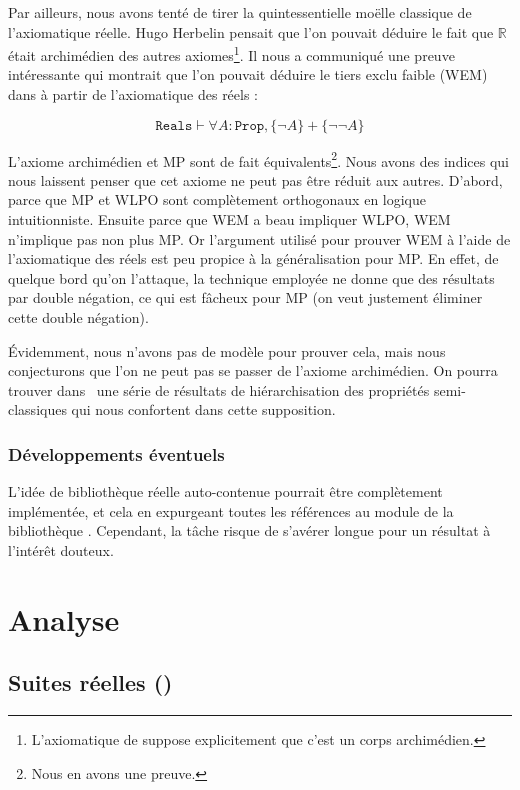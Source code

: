 Par ailleurs, nous avons tenté de tirer la quintessentielle moëlle classique de l'axiomatique réelle. Hugo Herbelin pensait que l'on pouvait déduire le fait que $\mathbb{R}$ était archimédien des autres axiomes\footnote{L'axiomatique de \coq suppose explicitement que c'est un corps archimédien.}. Il nous a communiqué une preuve intéressante qui montrait que l'on pouvait déduire le tiers exclu faible (WEM) dans  à partir de l'axiomatique des réels :

$$\mathtt{Reals}\vdash\forall A : \mathtt{Prop}, \{\neg A\} + \{\neg\neg A\}$$

L'axiome archimédien et MP sont de fait équivalents\footnote{Nous en avons une preuve.}. Nous avons des indices qui nous laissent penser que cet axiome ne peut pas être réduit aux autres. D'abord, parce que MP et WLPO sont complètement orthogonaux en logique intuitionniste. Ensuite parce que WEM a beau impliquer WLPO, WEM n'implique pas non plus MP. Or l'argument utilisé pour prouver WEM à l'aide de l'axiomatique des réels est peu propice à la généralisation pour MP. En effet, de quelque bord qu'on l'attaque, la technique employée ne donne que des résultats par double négation, ce qui est fâcheux pour MP (on veut justement éliminer cette double négation).

Évidemment, nous n'avons pas de modèle pour prouver cela, mais nous conjecturons que l'on ne peut pas se passer de l'axiome archimédien. On pourra trouver dans~\cite{LICS04} une série de résultats de hiérarchisation des propriétés semi-classiques qui nous confortent dans cette supposition.

\subsubsection{Développements éventuels}

L'idée de bibliothèque réelle auto-contenue pourrait être complètement implémentée, et cela en expurgeant toutes les références au module  de la bibliothèque . Cependant, la tâche risque de s'avérer longue pour un résultat à l'intérêt douteux.

\section{Analyse}

\subsection{Suites réelles ()}

